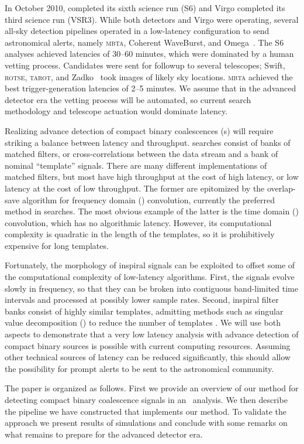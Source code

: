 In October 2010, \LIGO{} completed its sixth science run
(S6) and Virgo completed its third science run (VSR3).  While both
\LIGO{} detectors and Virgo were operating, several all-sky detection
pipelines operated in a low-latency configuration to send astronomical alerts,
namely \textsc{mbta}, Coherent WaveBurst, and
Omega~\cite{HugheyGWPAW2011, S6lowlatency}.
 The S6 analyses
achieved latencies of 30--60 minutes, which were dominated by a human vetting
process. Candidates were sent for \EM{} followup to several
telescopes; Swift, \textsc{rotse}, \textsc{tarot}, and Zadko~\cite{kanner2008,
HugheyGWPAW2011} took images of likely sky locations.  \textsc{mbta} achieved
the best \GW{} trigger-generation latencies of 2--5 minutes.  We
assume that in the advanced detector era the vetting process will be automated,
so current \GW{} search methodology and telescope actuation would
dominate latency.

Realizing advance detection of compact binary coalescences (\CBC{}s) will
require striking a balance between latency and throughput. \CBC{} searches
consist of banks of matched filters, or
cross-correlations between the data stream and a bank of nominal ``template''
signals.  There are many different implementations of matched filters, but most
have high throughput at the cost of high latency, or low latency at the cost of
low throughput.  The former are epitomized by the overlap-save algorithm
\cite{numerical-recipes-chapter-13} for frequency domain (\FD) convolution,
currently the preferred method in \GW{}
searches.  The most obvious example of the latter is the time domain
(\TD) convolution, which has no algorithmic latency.  However, its
computational complexity is quadratic in the length of the templates, so it is
prohibitively expensive for long templates.

Fortunately, the morphology of inspiral signals can be exploited to offset some
of the computational complexity of low-latency algorithms.  First, the signals
evolve slowly in frequency, so that they can be broken into contiguous
band-limited time intervals and processed at possibly lower sample rates.
Second, inspiral filter banks consist of highly similar templates, admitting
methods such as singular value decomposition (\SVD{}) to reduce the number of
templates \cite{Cannon:2010p10398}. We will use both aspects to demonstrate that a very
low latency analysis with advance detection of compact binary sources is
possible with current computing resources.  Assuming other technical sources of
latency can be reduced significantly, this should allow the possibility for
prompt alerts to be sent to the astronomical community.

The paper is organized as follows. First we provide an overview of our method
for detecting compact binary coalescence signals in an \earlywarning\ analysis.
We then describe the pipeline we have constructed that implements our method.
To validate the approach we present results of simulations and conclude with
some remarks on what remains to prepare for the advanced detector era.

